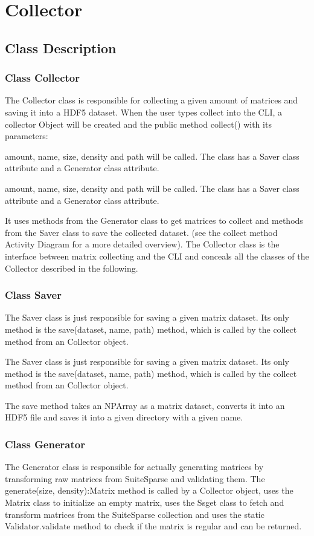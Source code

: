 \documentclass[parskip=full]{scrartcl}
\begin{document}
\section{Collector}

\subsection{Class Description}

\subsubsection{Class Collector}
The Collector class is responsible for collecting a given amount of matrices and saving it into a HDF5 dataset.
When the user types collect into the CLI, a collector Object will be created and the public method collect() with its parameters:

amount, name, size, density and path will be called. The class has a Saver class attribute and a Generator class attribute.

amount, name, size, density and path will be called. The class has a Saver class attribute and a Generator class attribute. 

It uses methods from the Generator class to get matrices to collect and methods from the Saver class to save the collected dataset.
(see the collect method Activity Diagram for a more detailed overview).
The Collector class is the interface between matrix collecting and the CLI and conceals all the classes of the Collector described in the following.

\subsubsection{Class Saver}

The Saver class is just responsible for saving a given matrix dataset.
Its only method is the save(dataset, name, path) method, which
is called by the collect method from an Collector object.

The Saver class is just responsible for saving a given matrix dataset. Its only method is the save(dataset, name, path) method, which
is called by the collect method from an Collector object. 

The save method takes an NPArray as a matrix dataset, converts it into an HDF5 file and saves it into a given directory with a given name.

\subsubsection{Class Generator}
The Generator class is responsible for actually generating matrices by transforming raw matrices from SuiteSparse and validating them.
The generate(size, density):Matrix method is called by a Collector object, uses the Matrix class to initialize an empty matrix, uses the Ssget class to fetch and transform matrices from the SuiteSparse collection and uses the static Validator.validate method to check if the matrix is regular and can be returned.
\end{document}
